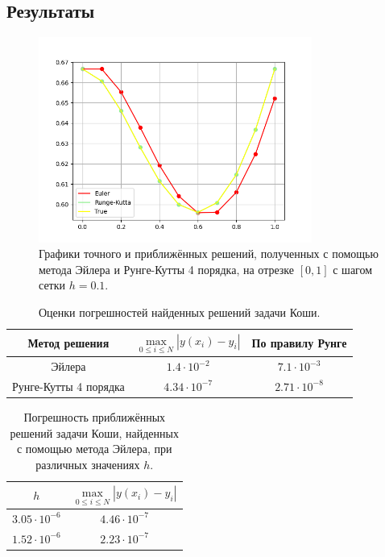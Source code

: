 \documentclass[12pt]{article}%
\begin{document}
\subsection{Результаты}
\begin{figure}[h]
    \centering
    \includegraphics[width=0.8\textwidth]{task1_plots.png}
    \caption{Графики точного и приближённых решений, полученных с помощью метода Эйлера и Рунге-Кутты 4 порядка, на отрезке $[0, 1]$ с шагом сетки $h=0.1$.}
\end{figure}

\begin{table}[!h]
    \centering
    \begin{tabular}{|c|c|c|}
    \hline Метод решения & 
            $\max\limits_{0 \leqslant i \leqslant N}|y(x_i) - y_i|$ & 
            По правилу Рунге  \\
    \hline Эйлера & 
            $1.4 \cdot 10^{-2}$ & 
            $7.1 \cdot 10^{-3}$ \\
    \hline Рунге-Кутты 4 порядка & 
            $4.34 \cdot 10^{-7}$ & 
            $2.71 \cdot 10^{-8}$ \\
    \hline
    \end{tabular}
    \caption{Оценки погрешностей найденных решений задачи Коши.}
\end{table}

\newpage
\begin{table}[!h]
    \centering
    \begin{tabular}{|c|c|}
    \hline $h$ & $\max\limits_{0 \leqslant i \leqslant N}|y(x_i) - y_i|$\\
    \hline $3.05 \cdot 10^{-6}$ & $4.46 \cdot 10^{-7}$ \\
    \hline $1.52 \cdot 10^{-6}$ & $2.23 \cdot 10^{-7}$ \\
    \hline
    \end{tabular}
    \caption{Погрешность приближённых решений задачи Коши, найденных с помощью метода Эйлера, при различных значениях $h$.}
\end{table}
\end{document}

